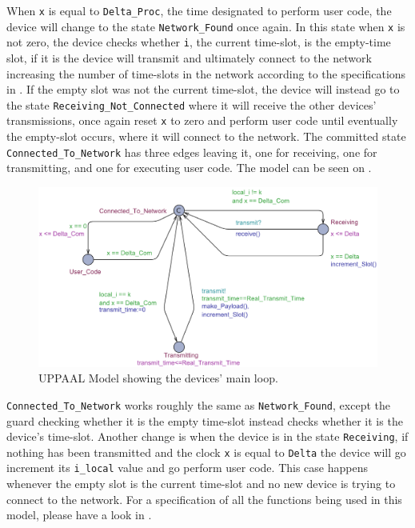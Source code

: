 \bigskip \noindent
When \texttt{x} is equal to \texttt{Delta\_Proc}, the time designated to perform user code, the device will change to the state \texttt{Network\_Found} once again.
In this state when \texttt{x} is not zero, the device checks whether \texttt{i}, the current time-slot, is the empty-time slot, if it is the device will transmit and ultimately connect to the network increasing the number of time-slots in the network according to the specifications in .
If the empty slot was not the current time-slot, the device will instead go to the state \texttt{Receiving\_Not\_Connected} where it will receive the other devices' transmissions, once again reset \texttt{x} to zero and perform user code until eventually the empty-slot occurs, where it will connect to the network.
The committed state \texttt{Connected\_To\_Network} has three edges leaving it, one for receiving, one for transmitting, and one for executing user code.
The model can be seen on .

\begin{figure}
  \includegraphics[width=1\textwidth]{Figures/Model/Device_Connected.pdf} 
\caption{UPPAAL Model showing the devices' main loop.}
\label{fig:UPPAAL_Connected}
\end{figure}

\texttt{Connected\_To\_Network} works roughly the same as \texttt{Network\_Found}, except the guard checking whether it is the empty time-slot instead checks whether it is the device's time-slot.
Another change is when the device is in the state \texttt{Receiving}, if nothing has been transmitted and the clock \texttt{x} is equal to \texttt{Delta} the device will go increment its \texttt{i\_local} value and go perform user code. 
This case happens whenever the empty slot is the current time-slot and no new device is trying to connect to the network.
For a specification of all the functions being used in this model, please have a look in .

